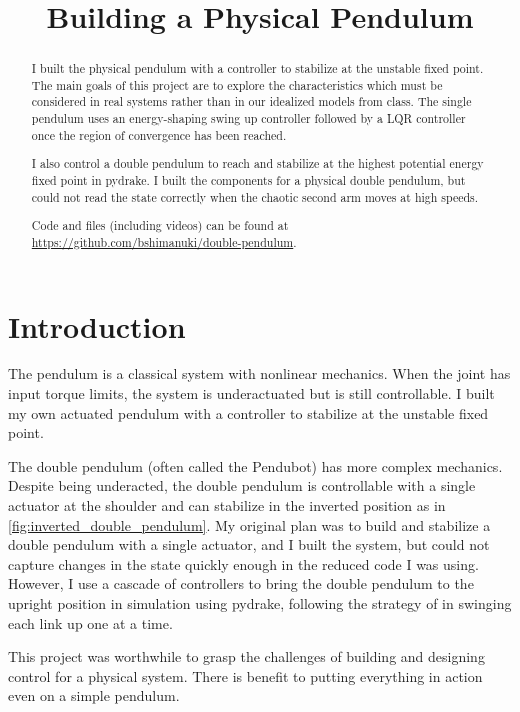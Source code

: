 \documentclass[conference]{IEEEtran}
\begin{document}
\title{Building a Physical Pendulum}

\author{
}

\maketitle

\begin{abstract}
	I built the physical pendulum with a controller to stabilize at the unstable fixed point. The main goals of this project are to explore the characteristics which must be considered in real systems rather than in our idealized models from class. The single pendulum uses an energy-shaping swing up controller followed by a LQR controller once the region of convergence has been reached.

	I also control a double pendulum to reach and stabilize at the highest potential energy fixed point in pydrake. I built the components for a physical double pendulum, but could not read the state correctly when the chaotic second arm moves at high speeds.

	Code and files (including videos) can be found at \url{https://github.com/bshimanuki/double-pendulum}.
\end{abstract}

\section{Introduction}
The pendulum is a classical system with nonlinear mechanics. When the joint has input torque limits, the system is underactuated but is still controllable. I built my own actuated pendulum with a controller to stabilize at the unstable fixed point.

The double pendulum (often called the Pendubot) has more complex mechanics. Despite being underacted, the double pendulum is controllable with a single actuator at the shoulder and can stabilize in the inverted position as in \cref{fig:inverted_double_pendulum}. My original plan was to build and stabilize a double pendulum with a single actuator, and I built the system, but could not capture changes in the state quickly enough in the reduced code I was using. However, I use a cascade of controllers to bring the double pendulum to the upright position in simulation using pydrake, following the strategy of \cite{albahkali} in swinging each link up one at a time.

This project was worthwhile to grasp the challenges of building and designing control for a physical system. There is benefit to putting everything in action even on a simple pendulum.
\end{document}
